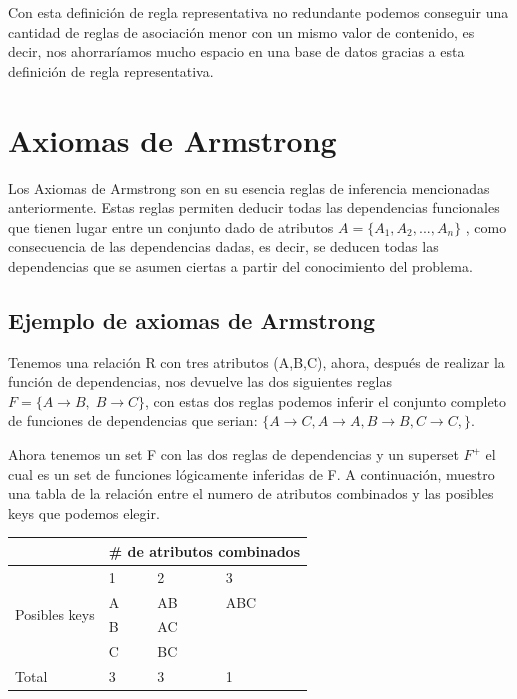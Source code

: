 \documentclass{cosas/tfg_domingo}
\begin{document}
Con esta definición de regla representativa no redundante podemos conseguir una cantidad de reglas de asociación menor con un mismo valor de contenido, es decir, nos ahorraríamos mucho espacio en una base de datos gracias a esta definición de regla representativa.

\section{Axiomas de Armstrong}

Los Axiomas de Armstrong son en su esencia reglas de inferencia mencionadas anteriormente.
Estas reglas permiten deducir todas las dependencias funcionales que tienen
lugar entre un conjunto dado de atributos $A=\{A_1,A_2,...,A_n\}$ , como consecuencia de las dependencias dadas, es decir, se deducen todas las dependencias que se asumen ciertas a partir del conocimiento del problema.

\subsection{Ejemplo de axiomas de Armstrong}
Tenemos una relación R con tres atributos (A,B,C), ahora, después de realizar la función de dependencias, nos devuelve las dos siguientes reglas $F = \{A \rightarrow B , \; B \rightarrow C\}$, con estas dos reglas podemos inferir el conjunto completo de funciones de dependencias que serian: $\{ A \rightarrow C , A \rightarrow A , B \rightarrow B , C \rightarrow C ,\}$.

Ahora tenemos un set F con las dos reglas de dependencias y un superset $F^+$ el cual es un set de funciones lógicamente inferidas de F. A continuación, muestro una tabla de la relación entre el numero de atributos combinados y las posibles keys que podemos elegir.

\begin{table}[h]
\begin{tabular}{|l|l|l|l|}
\hline
                               & \multicolumn{3}{l|}{\# de atributos combinados} \\ \hline
\multirow{4}{*}{Posibles keys} & 1              & 2               & 3                \\ \cline{2-4} 
                               & A              & AB              & ABC              \\ \cline{2-4} 
                               & B              & AC              &                  \\ \cline{2-4} 
                               & C              & BC              &                  \\ \hline
Total                          & 3              & 3               & 1                \\ \hline
\end{tabular}
\end{table}
\end{document}

